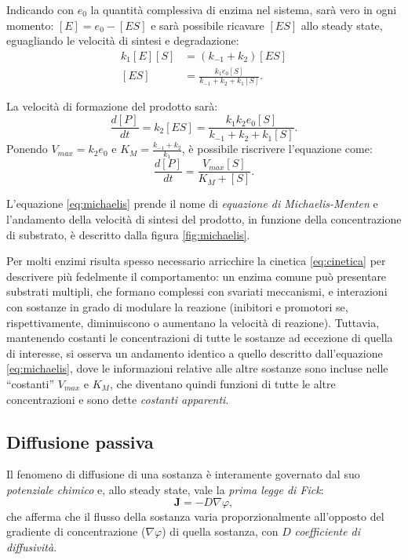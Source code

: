 	Indicando con $e_0$ la quantit\`a complessiva di enzima nel sistema, sar\`a vero in ogni momento: $[E] = e_0 - [ES]$ e sar\`a possibile ricavare $[ES]$ allo steady state, eguagliando le velocit\`a di sintesi e degradazione:
	\begin{align*}
		k_1[E][S] &= (k_{-1} + k_2)[ES]\\
		[ES] &= \frac{k_1 e_0 [S]}{k_{-1} + k_2 + k_1[S]}.
	\end{align*}
	
	La velocit\`a di formazione del prodotto sar\`a:
	\begin{equation*}
		\frac{d[P]}{dt} = k_2 [ES] = \frac{k_1 k_2 e_0 [S]}{k_{-1} + k_2 + k_1[S]}.
	\end{equation*}
	Ponendo $V_{max} = k_2 e_0$ e $K_M = \frac{k_{-1} + k_2}{k_1}$, \`e possibile riscrivere l'equazione come:
	\begin{equation}
	\frac{d[P]}{dt} = \frac{V_{max} [S]}{K_M + [S]}.
	\label{eq:michaelis}
	\end{equation}
	
	L'equazione \ref{eq:michaelis} prende il nome di \emph{equazione di Michaelis-Menten} e l'andamento della velocit\`a di sintesi del prodotto, in funzione della concentrazione di substrato, \`e descritto dalla figura \ref{fig:michaelis}.
	
	Per molti enzimi risulta spesso necessario arricchire la cinetica \ref{eq:cinetica} per descrivere pi\`u fedelmente il comportamento: un enzima comune pu\`o presentare substrati multipli, che formano complessi con svariati meccanismi, e interazioni con sostanze in grado di modulare la reazione (inibitori e promotori se, rispettivamente, diminuiscono o aumentano la velocit\`a di reazione).
	Tuttavia, mantenendo costanti le concentrazioni di tutte le sostanze ad eccezione di quella di interesse, si osserva un andamento identico a quello descritto dall'equazione \ref{eq:michaelis}, dove le informazioni relative alle altre sostanze sono incluse nelle ``costanti'' $V_{max}$ e $K_M$, che diventano quindi funzioni di tutte le altre concentrazioni e sono dette \emph{costanti apparenti}.
	
	\subsection{Diffusione passiva}
	Il fenomeno di diffusione di una sostanza \`e interamente governato dal suo \emph{potenziale chimico} e, allo steady state, vale la \emph{prima legge di Fick}:
	\begin{equation*}
		\mathbf{J} = -D \nabla \varphi,
	\end{equation*}
	che afferma che il flusso della sostanza varia proporzionalmente all'opposto del gradiente di concentrazione ($\nabla \varphi$) di quella sostanza, con $D$ \emph{coefficiente di diffusivit\`a}.
	
